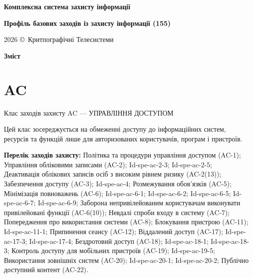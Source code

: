 \documentclass{article}
\newcommand\HUGE[1]{\fontsize{40}{40}\selectfont #1}
\begin{document}
\pagestyle{fancy}

\begin{titlepage}
  \AddToShipoutPictureBG*{\AtPageLowerLeft{\color{nato}\rule{\paperwidth}{\paperheight}}}
  \color{white}\thispagestyle{empty}\vspace*{4cm}\centering
  {\Huge  \textbf{Комплексна система захисту інформації} \par} \vspace{2cm}
  {\HUGE  \textbf{Профіль базових заходів із захисту інформації (155)} \par} \vspace{2.5cm}
  \vfill
  {\large 2026 \copyright\ Критпографічні Телесистеми \par}
\end{titlepage}

\newpage

\begin{center}
  {\Huge\color{nato}\bfseries Зміст\par}
\end{center}
\vspace{40pt}
\tableofcontents

\begin{abstract}
Базовий профіль — затверджується Адміністрацією Держспецзв’язку (наказом).
\end{abstract}

\section{AC}
Клас заходів захисту AC --- УПРАВЛІННЯ ДОСТУПОМ

Цей клас зосереджується на обмеженні доступу до інформаційних систем, ресурсів та функцій лише для авторизованих користувачів, програм і пристроїв.

\textbf{Перелік заходів захисту:} Політика та процедури управління доступом (AC-1); Управління обліковими записами (AC-2); Id-spe-ac-2-3; Id-spe-ac-2-5; Деактивація облікових записів осіб з високим рівнем ризику (AC-2(13)); Забезпечення доступу (AC-3); Id-spe-ac-4; Розмежування обов'язків (AC-5); Мінімізація повноважень (AC-6); Id-spe-ac-6-1; Id-spe-ac-6-2; Id-spe-ac-6-5; Id-spe-ac-6-7; Id-spe-ac-6-9; Заборона непривілейованим користувачам виконувати привілейовані функції (AC-6(10)); Невдалі спроби входу в систему (AC-7); Попередження про використання системи (AC-8); Блокування пристрою (AC-11); Id-spe-ac-11-1; Припинення сеансу (AC-12); Віддалений доступ (AC-17); Id-spe-ac-17-3; Id-spe-ac-17-4; Бездротовий доступ (AC-18); Id-spe-ac-18-1; Id-spe-ac-18-3; Контроль доступу для мобільних пристроїв (AC-19); Id-spe-ac-19-5; Використання зовнішніх систем (AC-20); Id-spe-ac-20-1; Id-spe-ac-20-2; Публічно доступний контент (AC-22).
\end{document}
